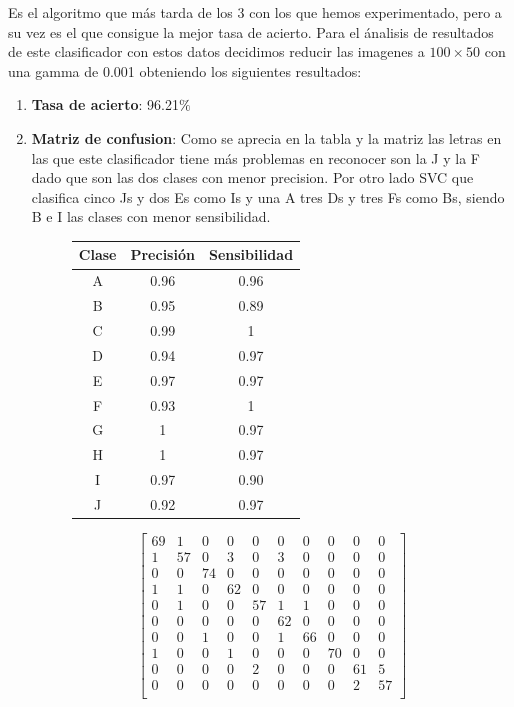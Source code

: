 \documentclass[8pt,a4paper]{article}
\begin{document}
Es el algoritmo que más tarda de los 3 con los que hemos experimentado, pero a su vez es el que consigue la mejor tasa de acierto. Para el ánalisis de resultados de este clasificador con estos datos decidimos reducir las imagenes a $100\times50$ con una gamma de 0.001 obteniendo los siguientes resultados:
\begin{enumerate}
\item \textbf{Tasa de acierto}: 96.21$\%$
\item \textbf{Matriz de confusion}:
Como se aprecia en la tabla y la matriz las letras en las que este clasificador tiene más problemas en reconocer son la J y la F dado que son las dos clases con menor precision. Por otro lado SVC que clasifica cinco Js y dos Es como Is y una A tres Ds y tres Fs como Bs, siendo B e I las clases con menor sensibilidad.
\begin{figure}[htbp]
\centering
\begin{minipage}{.5\textwidth}
    \begin{tabular}{|c|c|c|} %
    \hline
      \textbf{Clase} & \textbf{Precisión} & \textbf{Sensibilidad}\\
      \hline
      A & 0.96 & 0.96\\
      \hline
      B & 0.95 & 0.89\\
      \hline
      C & 0.99 & 1\\
      \hline
      D & 0.94 & 0.97\\
      \hline
      E & 0.97 & 0.97\\
      \hline
      F & 0.93 & 1\\
      \hline
      G & 1    & 0.97\\
      \hline
      H & 1    & 0.97\\
      \hline
      I & 0.97 & 0.90\\
      \hline
      J & 0.92 & 0.97\\
      \hline
    \end{tabular}
\end{minipage}%
\begin{minipage}{.5\textwidth}
\[
  \begin{bmatrix}
    69 & 1 & 0 & 0 & 0 & 0 & 0 & 0 & 0 & 0 \\
    1 & 57 & 0 & 3 & 0 & 3 & 0 & 0 & 0 & 0 \\
    0 & 0 & 74 & 0 & 0 & 0 & 0 & 0 & 0 & 0 \\
    1 & 1 & 0 & 62 & 0 & 0 & 0 & 0 & 0 & 0 \\
    0 & 1 & 0 & 0 & 57 & 1 & 1 & 0 & 0 & 0 \\
    0 & 0 & 0 & 0 & 0 & 62 & 0 & 0 & 0 & 0 \\
    0 & 0 & 1 & 0 & 0 & 1 & 66 & 0 & 0 & 0 \\
    1 & 0 & 0 & 1 & 0 & 0 & 0 & 70 & 0 & 0 \\
    0 & 0 & 0 & 0 & 2 & 0 & 0 & 0 & 61 & 5 \\
    0 & 0 & 0 & 0 & 0 & 0 & 0 & 0 & 2 & 57 \\
  \end{bmatrix}
\]
\end{minipage}
\end{figure}


\end{enumerate}
\end{document}
